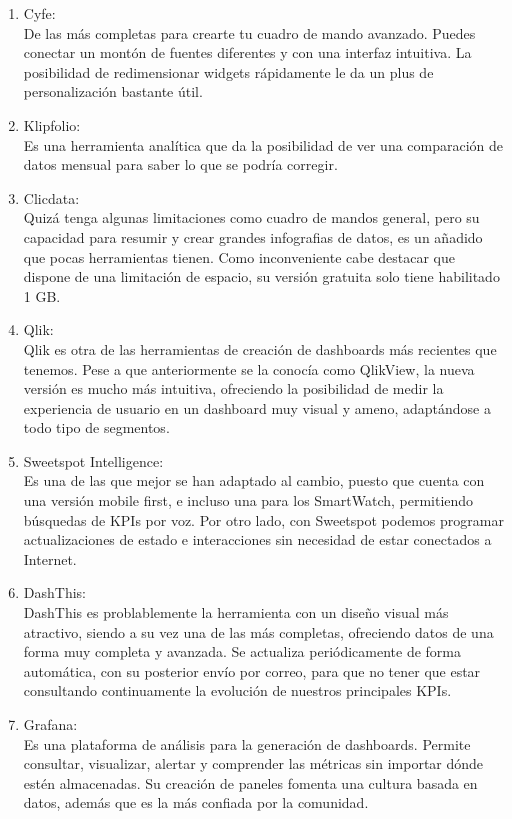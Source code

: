 \documentclass[ spanish, a4paper, 12pt, oneside]{report}
\begin{document}
\begin{enumerate}
   \item Cyfe: \\
   De las más completas para crearte tu cuadro de mando avanzado. Puedes conectar un montón de fuentes diferentes y con una interfaz intuitiva. La posibilidad de redimensionar widgets rápidamente le da un plus de personalización bastante útil. 
   \item Klipfolio: \\
   Es una herramienta analítica que da la posibilidad de ver una comparación de datos mensual para saber lo que se podría corregir.
   \item Clicdata: \\
   Quizá tenga algunas limitaciones como cuadro de mandos general, pero su capacidad para resumir y crear grandes infografias de datos, es un añadido que pocas herramientas tienen. Como inconveniente cabe destacar que dispone de una limitación de espacio, su versión gratuita solo tiene habilitado 1 GB.
   \item Qlik: \\
   Qlik es otra de las herramientas de creación de dashboards más recientes que tenemos. Pese a que anteriormente se la conocía como QlikView, la nueva versión es mucho más intuitiva, ofreciendo la posibilidad de medir la experiencia de usuario en un dashboard muy visual y ameno, adaptándose a todo tipo de segmentos.
   \item Sweetspot Intelligence: \\
   Es una de las que mejor se han adaptado al cambio, puesto que cuenta con una versión mobile first, e incluso una para los SmartWatch, permitiendo búsquedas de KPIs por voz. 
   Por otro lado, con Sweetspot podemos programar actualizaciones de estado e interacciones sin necesidad de estar conectados a Internet.
   \item DashThis: \\
   DashThis es problablemente la herramienta con un diseño visual más atractivo, siendo a su vez una de las más completas, ofreciendo datos de una forma muy completa y avanzada.
   Se actualiza periódicamente de forma automática, con su posterior envío por correo, para que no tener que estar consultando continuamente la evolución de nuestros principales KPIs.
   \item Grafana: \\
   Es una plataforma de análisis para la generación de dashboards. Permite consultar, visualizar, alertar y comprender las métricas sin importar dónde estén almacenadas. Su creación de paneles fomenta una cultura basada en datos, además que es la más confiada por la comunidad.
\end{enumerate}
\end{document}
